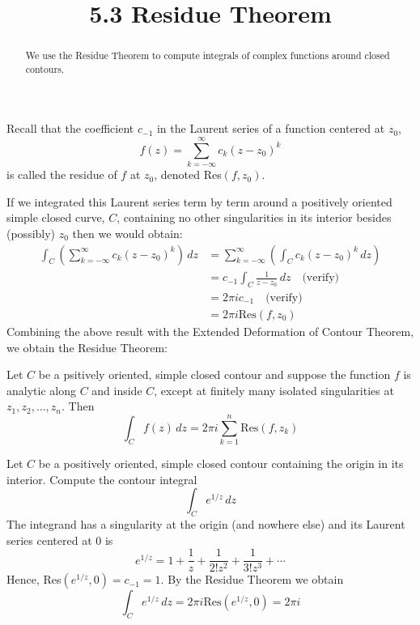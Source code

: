 \documentclass[handout]{ximera}
\title{5.3 Residue Theorem}
\begin{document}
\begin{abstract}
We use the Residue Theorem to compute integrals of complex functions around closed contours.
\end{abstract}

\maketitle


Recall that the coefficient $c_{-1}$ in the Laurent series of a function centered at $z_0$,
\[
f(z) = \sum_{k=-\infty}^\infty c_k (z-z_0)^k
\]
is called the residue of $f$ at $z_0$, denoted Res$(f,z_0)$.

If we integrated this Laurent series term by term around a positively oriented simple closed curve, $C$, containing no other 
singularities in its interior besides (possibly) $z_0$ then we would obtain:
\begin{align*}
\int_C \left(\sum_{k=-\infty}^\infty c_k (z-z_0)^k \right)\, dz &= \sum_{k=-\infty}^\infty \left( \int_C c_k (z-z_0)^k \, dz \right)\\
&= c_{-1} \int_C \frac{1}{z-z_0} \, dz \quad \text{(verify)}\\
&= 2\pi i c_{-1} \quad \text{(verify)}\\
&= 2\pi i \text{Res}(f, z_0)
\end{align*}
Combining the above result with the Extended Deformation of Contour Theorem, we obtain the Residue Theorem:

\begin{theorem}
Let $C$ be a psitively oriented, simple closed contour and suppose the function $f$ is analytic along $C$ and inside $C$,
except at finitely many isolated singularities at $z_1, z_2, \dots, z_n$. Then
\[
\int_C f(z) \, dz = 2\pi i \sum_{k=1}^n \text{Res}(f,z_k)
\]
\end{theorem}


\begin{example}[example 1a]
Let $C$ be a positively oriented, simple closed contour containing the origin in its interior.
Compute the contour integral
\[
\int_C e^{1/z} \, dz
\]
The integrand has a singularity at the origin (and nowhere else) and its Laurent series centered at $0$ is
\[
e^{1/z} = 1 + \frac{1}{z} + \frac{1}{2!z^2} + \frac{1}{3! z^3} + \cdots
\]
Hence, Res$(e^{1/z},0) = c_{-1} = 1$. By the Residue Theorem we obtain
\[
\int_C e^{1/z} \, dz = 2\pi i \text{Res}(e^{1/z}, 0) = 2\pi i
\]
\end{example}
\end{document}
